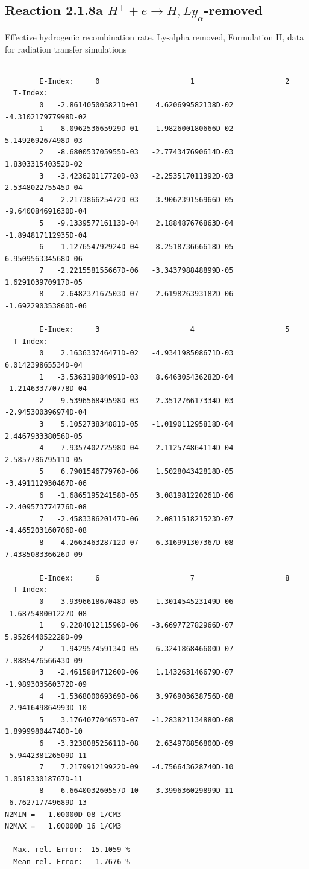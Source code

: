 \documentclass[12pt,dvipdfmx]{article}
\begin{document}
\subsection{
Reaction 2.1.8a  $H^+ + e \rightarrow H, Ly_\alpha$-removed
}


   Effective hydrogenic recombination rate.
   Ly-alpha removed, Formulation II,
   data for radiation transfer simulations

\begin{small}\begin{verbatim}

        E-Index:     0                     1                     2
  T-Index:
        0   -2.861405005821D+01    4.620699582138D-02   -4.310217977998D-02
        1   -8.096253665929D-01   -1.982600180666D-02    5.149269267498D-03
        2   -8.680053705955D-03   -2.774347690614D-03    1.830331540352D-02
        3   -3.423620117720D-03   -2.253517011392D-03    2.534802275545D-04
        4    2.217386625472D-03    3.906239156966D-05   -9.640084691630D-04
        5   -9.133957716113D-04    2.188487676863D-04   -1.894817112935D-04
        6    1.127654792924D-04    8.251873666618D-05    6.950956334568D-06
        7   -2.221558155667D-06   -3.343798848899D-05    1.629103970917D-05
        8   -2.648237167503D-07    2.619826393182D-06   -1.692290353860D-06

        E-Index:     3                     4                     5
  T-Index:
        0    2.163633746471D-02   -4.934198508671D-03    6.014239865534D-04
        1   -3.536319884091D-03    8.646305436282D-04   -1.214633770778D-04
        2   -9.539656849598D-03    2.351276617334D-03   -2.945300396974D-04
        3    5.105273834881D-05   -1.019011295818D-04    2.446793338056D-05
        4    7.935740272598D-04   -2.112574864114D-04    2.585778679511D-05
        5    6.790154677976D-06    1.502804342818D-05   -3.491112930467D-06
        6   -1.686519524158D-05    3.081981220261D-06   -2.409573774776D-08
        7   -2.458338620147D-06    2.081151821523D-07   -4.465203160706D-08
        8    4.266346328712D-07   -6.316991307367D-08    7.438508336626D-09

        E-Index:     6                     7                     8
  T-Index:
        0   -3.939661867048D-05    1.301454523149D-06   -1.687548001227D-08
        1    9.228401211596D-06   -3.669772782966D-07    5.952644052228D-09
        2    1.942957459134D-05   -6.324186846600D-07    7.888547656643D-09
        3   -2.461588471260D-06    1.143263146679D-07   -1.989303560372D-09
        4   -1.536800069369D-06    3.976903638756D-08   -2.941649864993D-10
        5    3.176407704657D-07   -1.283821134880D-08    1.899998044740D-10
        6   -3.323808525611D-08    2.634978856800D-09   -5.944238126509D-11
        7    7.217991219922D-09   -4.756643628740D-10    1.051833018767D-11
        8   -6.664003260557D-10    3.399636029899D-11   -6.762717749689D-13
N2MIN =   1.00000D 08 1/CM3
N2MAX =   1.00000D 16 1/CM3

  Max. rel. Error:  15.1059 %
  Mean rel. Error:   1.7676 %



\end{verbatim}\end{small}
\end{document}
